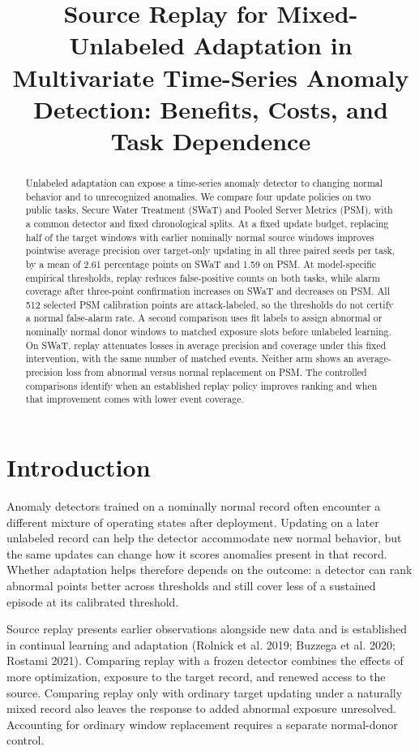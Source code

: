 \documentclass[
  american,
]{article}
\title{Source Replay for Mixed-Unlabeled Adaptation in Multivariate
Time-Series Anomaly Detection: Benefits, Costs, and Task Dependence}
\author{}
\date{}
\begin{document}
\maketitle
\begin{abstract}
Unlabeled adaptation can expose a time-series anomaly detector to
changing normal behavior and to unrecognized anomalies. We compare four
update policies on two public tasks, Secure Water Treatment (SWaT) and
Pooled Server Metrics (PSM), with a common detector and fixed
chronological splits. At a fixed update budget, replacing half of the
target windows with earlier nominally normal source windows improves
pointwise average precision over target-only updating in all three
paired seeds per task, by a mean of 2.61 percentage points on SWaT and
1.59 on PSM. At model-specific empirical thresholds, replay reduces
false-positive counts on both tasks, while alarm coverage after
three-point confirmation increases on SWaT and decreases on PSM. All 512
selected PSM calibration points are attack-labeled, so the thresholds do
not certify a normal false-alarm rate. A second comparison uses fit
labels to assign abnormal or nominally normal donor windows to matched
exposure slots before unlabeled learning. On SWaT, replay attenuates
losses in average precision and coverage under this fixed intervention,
with the same number of matched events. Neither arm shows an
average-precision loss from abnormal versus normal replacement on PSM.
The controlled comparisons identify when an established replay policy
improves ranking and when that improvement comes with lower event
coverage.
\end{abstract}

\section{Introduction}\label{introduction}

Anomaly detectors trained on a nominally normal record often encounter a
different mixture of operating states after deployment. Updating on a
later unlabeled record can help the detector accommodate new normal
behavior, but the same updates can change how it scores anomalies
present in that record. Whether adaptation helps therefore depends on
the outcome: a detector can rank abnormal points better across
thresholds and still cover less of a sustained episode at its calibrated
threshold.

Source replay presents earlier observations alongside new data and is
established in continual learning and adaptation (Rolnick et al. 2019;
Buzzega et al. 2020; Rostami 2021). Comparing replay with a frozen
detector combines the effects of more optimization, exposure to the
target record, and renewed access to the source. Comparing replay only
with ordinary target updating under a naturally mixed record also leaves
the response to added abnormal exposure unresolved. Accounting for
ordinary window replacement requires a separate normal-donor control.
\end{document}
